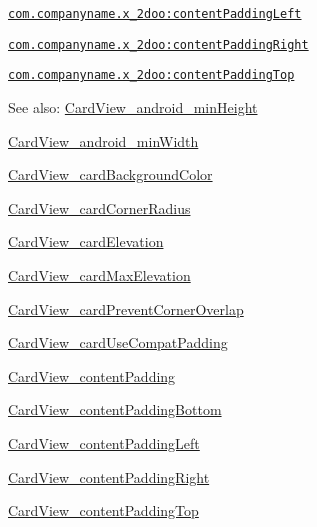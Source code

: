 {\tt \hyperlink{classandroid_1_1support_1_1v4_1_1_r_1_1styleable_aa20756d855da0a9dc2951095592f94f}{com.companyname.x\_\-2doo:contentPaddingLeft}}

{\tt \hyperlink{classandroid_1_1support_1_1v4_1_1_r_1_1styleable_4b71c60ba2365d3191e754c31a6013a6}{com.companyname.x\_\-2doo:contentPaddingRight}}

{\tt \hyperlink{classandroid_1_1support_1_1v4_1_1_r_1_1styleable_4a2edd3e314f6cd115aba1e91f596d81}{com.companyname.x\_\-2doo:contentPaddingTop}}

\begin{Desc}
\item[See also:]\hyperlink{classandroid_1_1support_1_1v4_1_1_r_1_1styleable_577b2e52dc2fbfc09f905ea26e5f682e}{CardView\_\-android\_\-minHeight} 

\hyperlink{classandroid_1_1support_1_1v4_1_1_r_1_1styleable_3cd23d6fa94330913ba4cb084d788c59}{CardView\_\-android\_\-minWidth} 

\hyperlink{classandroid_1_1support_1_1v4_1_1_r_1_1styleable_94fc58f0d182831ec612958ddf3d8b9f}{CardView\_\-cardBackgroundColor} 

\hyperlink{classandroid_1_1support_1_1v4_1_1_r_1_1styleable_aac33a30bef514283621969faf8acce1}{CardView\_\-cardCornerRadius} 

\hyperlink{classandroid_1_1support_1_1v4_1_1_r_1_1styleable_c0ff8cacb9a2d63dd25ab692b44a2804}{CardView\_\-cardElevation} 

\hyperlink{classandroid_1_1support_1_1v4_1_1_r_1_1styleable_7e06403a899e01eae19c14aae1ee38cc}{CardView\_\-cardMaxElevation} 

\hyperlink{classandroid_1_1support_1_1v4_1_1_r_1_1styleable_7759a07eb90cf3b5a562d36a7f68e79f}{CardView\_\-cardPreventCornerOverlap} 

\hyperlink{classandroid_1_1support_1_1v4_1_1_r_1_1styleable_5fa6aadc3bb0cfa41fd1cf7e91655290}{CardView\_\-cardUseCompatPadding} 

\hyperlink{classandroid_1_1support_1_1v4_1_1_r_1_1styleable_5c42c3e1c3a5864233a443fd167fc4e3}{CardView\_\-contentPadding} 

\hyperlink{classandroid_1_1support_1_1v4_1_1_r_1_1styleable_a790a1e2e5bcbfb64d641cb1be13698d}{CardView\_\-contentPaddingBottom} 

\hyperlink{classandroid_1_1support_1_1v4_1_1_r_1_1styleable_aa20756d855da0a9dc2951095592f94f}{CardView\_\-contentPaddingLeft} 

\hyperlink{classandroid_1_1support_1_1v4_1_1_r_1_1styleable_4b71c60ba2365d3191e754c31a6013a6}{CardView\_\-contentPaddingRight} 

\hyperlink{classandroid_1_1support_1_1v4_1_1_r_1_1styleable_4a2edd3e314f6cd115aba1e91f596d81}{CardView\_\-contentPaddingTop} \end{Desc}
